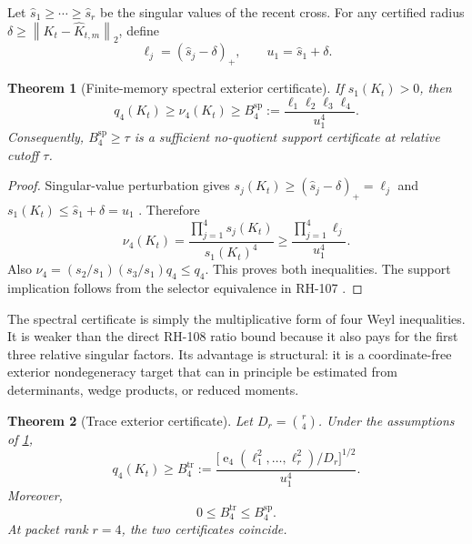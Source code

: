 \documentclass[11pt]{article}
\newtheorem{theorem}{Theorem}[section]
\theoremstyle{definition}
\theoremstyle{remark}
\newcommand{\norm}[1]{\left\lVert#1\right\rVert}
\newcommand{\e}{\operatorname{e}}
\begin{document}
Let $\widehat s_1\ge\cdots\ge\widehat s_r$ be the singular values of the
recent cross.  For any certified radius $\delta\ge
\norm{K_t-\widehat K_{t,m}}_2$, define
\begin{equation}
 \ell_j=(\widehat s_j-\delta)_+,
 \qquad u_1=\widehat s_1+\delta.
 \label{eq:ell}
\end{equation}

\begin{theorem}[Finite-memory spectral exterior certificate]
\label{thm:spectral}
If $s_1(K_t)>0$, then
\begin{equation}
 q_4(K_t)\ge\nu_4(K_t)\ge
 B_4^{\mathrm{sp}}
 :=\frac{\ell_1\ell_2\ell_3\ell_4}{u_1^4}.
 \label{eq:spectral-certificate}
\end{equation}
Consequently, $B_4^{\mathrm{sp}}\ge\tau$ is a sufficient no-quotient support
certificate at relative cutoff $\tau$.
\end{theorem}

\begin{proof}
Singular-value perturbation gives
$s_j(K_t)\ge(\widehat s_j-\delta)_+=\ell_j$ and
$s_1(K_t)\le\widehat s_1+\delta=u_1$
\citep{Bhatia1997,StewartSun1990}.  Therefore
\[
 \nu_4(K_t)
 =\frac{\prod_{j=1}^4s_j(K_t)}{s_1(K_t)^4}
 \ge\frac{\prod_{j=1}^4\ell_j}{u_1^4}.
\]
Also
$\nu_4=(s_2/s_1)(s_3/s_1)q_4\le q_4$.  This proves both inequalities.
The support implication follows from the selector equivalence in RH-107
\citep{WangSupportLaw2026}.
\end{proof}

The spectral certificate is simply the multiplicative form of four Weyl
inequalities.  It is weaker than the direct RH-108 ratio bound because it
also pays for the first three relative singular factors.  Its advantage is
structural: it is a coordinate-free exterior nondegeneracy target that can
in principle be estimated from determinants, wedge products, or reduced
moments.

\begin{theorem}[Trace exterior certificate]
\label{thm:trace}
Let $D_r=\binom r4$.  Under the assumptions of
\cref{thm:spectral},
\begin{equation}
 q_4(K_t)\ge
 B_4^{\mathrm{tr}}
 :=\frac{\bigl[\e_4(\ell_1^2,\ldots,\ell_r^2)/D_r\bigr]^{1/2}}
          {u_1^4}.
 \label{eq:trace-certificate}
\end{equation}
Moreover,
\begin{equation}
 0\le B_4^{\mathrm{tr}}\le B_4^{\mathrm{sp}}.
 \label{eq:trace-order}
\end{equation}
At packet rank $r=4$, the two certificates coincide.
\end{theorem}
\end{document}
